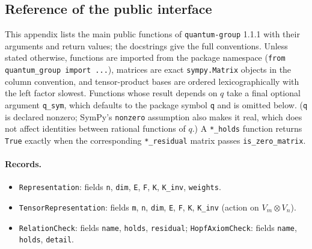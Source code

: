 \documentclass{SciPost}
\newcommand{\pkg}{\texttt{quantum-group}}
\begin{document}
\begin{appendix}

\section{Reference of the public interface}
\label{app:api}
\begingroup\raggedright

This appendix lists the main public functions of \pkg{} 1.1.1 with their arguments and return values; the docstrings give the full conventions. Unless stated otherwise, functions are imported from the package namespace (\texttt{from quantum\_group import ...}), matrices are exact \texttt{sympy.Matrix} objects in the column convention, and tensor-product bases are ordered lexicographically with the left factor slowest. Functions whose result depends on $q$ take a final optional argument \texttt{q\_sym}, which defaults to the package symbol \texttt{q} and is omitted below. (\texttt{q} is declared nonzero; SymPy's \texttt{nonzero} assumption also makes it real, which does not affect identities between rational functions of $q$.) A \texttt{*\_holds} function returns \texttt{True} exactly when the corresponding \texttt{*\_residual} matrix passes \texttt{is\_zero\_matrix}.

\paragraph{Records.}
\begin{itemize}\setlength{\itemsep}{1pt}\setlength{\parskip}{0pt}
\item \texttt{Representation}: fields \texttt{n}, \texttt{dim}, \texttt{E}, \texttt{F}, \texttt{K}, \texttt{K\_inv}, \texttt{weights}.
\item \texttt{TensorRepresentation}: fields \texttt{m}, \texttt{n}, \texttt{dim}, \texttt{E}, \texttt{F}, \texttt{K}, \texttt{K\_inv} (action on $V_m\otimes V_n$).
\item \texttt{RelationCheck}: fields \texttt{name}, \texttt{holds}, \texttt{residual}; \texttt{HopfAxiomCheck}: fields \texttt{name}, \texttt{holds}, \texttt{detail}.
\end{itemize}


\end{appendix}
\end{document}
